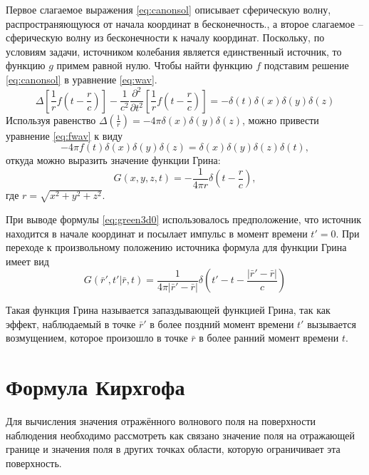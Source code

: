 \documentclass[a4paper, fontsize=14pt]{article}
\begin{document}
Первое слагаемое выражения \ref{eq:canonsol}  описывает сферическую волну, распространяющуюся от начала координат в бесконечность., а второе слагаемое -- сферическую волну из бесконечности к началу координат. Поскольку, по условиям задачи, источником колебания является единственный источник, то функцию $g$ примем равной нулю.  Чтобы найти функцию  $f$  подставим решение \ref{eq:canonsol} в уравнение \ref{eq:wav}. 
\begin{equation}
	\Delta \left[ \frac{1}{r}f\left(t-\frac{r}{c}\right) \right] - \frac{1}{c^2} \frac{\partial^2 }{\partial
		t^2}\left[ \frac{1}{r}f\left(t-\frac{r}{c}\right) \right]  = - \delta(t)\delta(x)\delta(y)\delta(z)
		\label{eq:fwav}
\end{equation}
Используя равенство $\Delta\left(\frac{1}{r}\right) = -4\pi \delta(x)\delta(y)\delta(z)$, можно привести уравнение \ref{eq:fwav}
к виду 
\begin{equation}
	-4\pi f(t) \delta(x) \delta(y) \delta(z)  = \delta(x) \delta(y) \delta(z) \delta(t),
\label{eq:fdel}	
\end{equation}
откуда можно выразить значение функции Грина:
\begin{equation}
	G(x,y,z,t) = -\frac{1}{4\pi r} \delta \left(t - \frac{r}{c}\right),
\label{eq:green3d0}	
\end{equation}  
где $r = \sqrt{x^2+y^2+z^2}$.

При выводе формулы \ref{eq:green3d0} использовалось предположение,  что источник находится в начале координат  и посылает импульс в момент времени $t' = 0$. При переходе к произвольному положению источника 
формула для функции Грина имеет вид
\begin{equation}
	G(\bar{r}',t'|\bar{r},t)= \frac{1}{4\pi|\bar{r}'-\bar{r}|}
	\delta\left(t'-t-\frac{|\bar{r}'-\bar{r}|}{c}\right)
\label{eq:green3d}
\end{equation}

	Такая функция Грина называется запаздывающей функцией Грина, так как эффект,
	наблюдаемый в точке $\bar{r}'$ в более поздний момент времени $t'$ вызывается
	возмущением,
	которое произошло в точке $\bar{r}$ в более ранний момент времени $t$.

	

	\section{Формула Кирхгофа}
	Для вычисления значения отражённого волнового поля на поверхности наблюдения необходимо 
	рассмотреть как связано значение поля на отражающей границе и значения поля в других точках области, которую ограничивает эта поверхность.   
	
\end{document}
